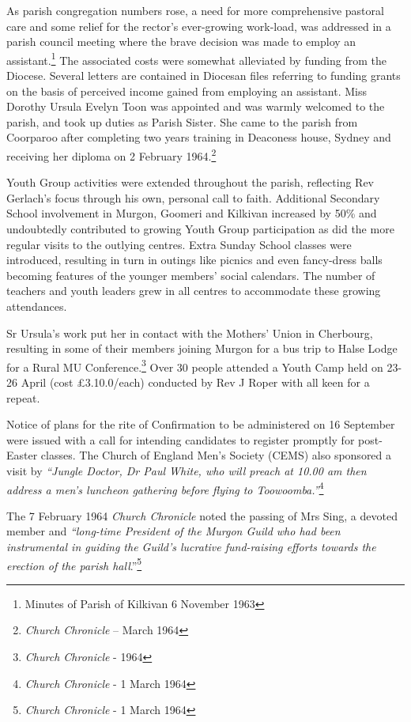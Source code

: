 As parish congregation numbers rose, a need for more comprehensive pastoral care and some relief for the rector's ever-growing work-load, was addressed in a parish council meeting where the brave decision was made to employ an assistant.\footnote{Minutes of Parish of Kilkivan 6 November 1963} The associated costs were somewhat alleviated by funding from the Diocese. Several letters are contained in Diocesan files referring to funding grants on the basis of perceived income gained from employing an assistant. Miss Dorothy Ursula Evelyn Toon was appointed and was warmly welcomed to the parish, and took up duties as Parish Sister. She came to the parish from Coorparoo after completing two years training in Deaconess house, Sydney and receiving her diploma on 2 February 1964.\footnote{\emph{Church Chronicle} -- March 1964}

Youth Group activities were extended throughout the parish, reflecting Rev Gerlach's focus through his own, personal call to faith. Additional Secondary School involvement in Murgon, Goomeri and Kilkivan increased by 50\% and undoubtedly contributed to growing Youth Group participation as did the more regular visits to the outlying centres. Extra Sunday School classes were introduced, resulting in turn in outings like picnics and even fancy-dress balls becoming features of the younger members' social calendars. The number of teachers and youth leaders grew in all centres to accommodate these growing attendances.

Sr Ursula's work put her in contact with the Mothers' Union in Cherbourg, resulting in some of their members joining Murgon for a bus trip to Halse Lodge for a Rural MU Conference.\footnote{\emph{Church Chronicle} - 1964} Over 30 people attended a Youth Camp held on 23-26 April (cost £3.10.0/each) conducted by Rev J Roper with all keen for a repeat.

Notice of plans for the rite of Confirmation to be administered on 16 September were issued with a call for intending candidates to register promptly for post-Easter classes. The Church of England Men's Society (CEMS) also sponsored a visit by \emph{``Jungle Doctor, Dr Paul White, who will preach at 10.00 am then address a men's luncheon gathering before flying to Toowoomba.''}\footnote{\emph{Church Chronicle} - 1 March 1964}

The 7 February 1964 \emph{Church Chronicle} noted the passing of Mrs Sing, a devoted member and \emph{``long-time President of the Murgon Guild who had been instrumental in guiding the Guild's lucrative fund-raising efforts towards the erection of the parish hall}.''\footnote{\emph{Church Chronicle} - 1 March 1964}

